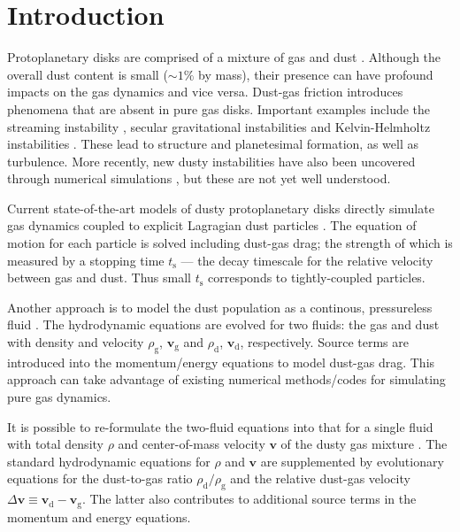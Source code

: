 \documentclass[iop, numberedappendix]{emulateapj}
\newcommand{\rhod}{\rho_\mathrm{d}}
\newcommand{\rhog}{\rho_\mathrm{g}}
\newcommand{\tstop}{t_\mathrm{s}}
\begin{document}
\section{Introduction}
Protoplanetary disks are comprised of a mixture of gas and dust
\citep{chiang10}. Although the overall dust content is small
($\sim 1\%$ by mass), their presence can have profound impacts on the 
gas dynamics and vice versa. Dust-gas friction introduces phenomena
that are absent in pure gas disks. Important examples include the
streaming instability 
\citep[SI,][]{youdin05a,youdin07b,johansen07}, secular gravitational
instabilities \citep[SGI,][]{ward00,youdin11,michikoshi12,takahashi14} and
Kelvin-Helmholtz instabilities
\citep{chiang08,barranco09,lee10}. These lead to structure and
planetesimal formation, as well as turbulence. 
More recently, new 
dusty instabilities have also been uncovered through numerical
simulations \citep{loren15,loren16,lamb16}, but these are not yet well
understood. 



Current state-of-the-art models of dusty protoplanetary
disks directly simulate gas dynamics coupled to explicit
Lagragian dust particles
\citep{nelson10,bai10,johansen11,yang14,zhu14,gibbons15,simon16,baruteau16}. 
The equation of motion for each particle is solved 
including dust-gas drag; the strength of which is measured 
by a stopping time $\tstop$ --- the decay timescale for the 
relative velocity between gas and dust. Thus small $\tstop$
corresponds to tightly-coupled particles. 


Another approach is to model the dust population as a continous, pressureless
fluid 
\citep{paardekooper06b,meheut12,laibe12,loren14,fu14b,surville16}. The 
hydrodynamic equations are evolved for two fluids: the gas and dust with density and
velocity $\rhog$, $\bm{v}_\mathrm{g}$ and $\rhod$, 
$\bm{v}_\mathrm{d}$, respectively. Source terms are introduced into
the momentum/energy equations to model dust-gas drag. This approach
can take advantage of existing numerical methods/codes for
simulating pure gas dynamics. 


It is possible to re-formulate the two-fluid equations into that for a
single fluid with total density $\rho$ and center-of-mass
velocity $\bm{v}$ of the dusty gas mixture
\citep{laibe14}. The standard hydrodynamic equations for
$\rho$ and $\bm{v}$ are supplemented by evolutionary equations for
the dust-to-gas ratio $\rhod/\rhog$ and the relative dust-gas velocity
$\Delta\bm{v}\equiv \bm{v}_\mathrm{d}-\bm{v}_\mathrm{g}$. The latter also contributes to 
additional source terms in the momentum and energy equations.  
\end{document}
